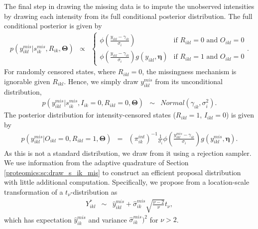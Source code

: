 The final step in drawing the missing data is to impute the unobserved intensities by drawing each intensity from its full conditional posterior distribution.
The full conditional posterior is given by
\begin{eqnarray*}
p(y_{ikl}^{mis}\vert s_{ik}^{mis},R_{ik},\bm{\Theta}) & \propto & \begin{cases}
\phi\left(\frac{y_{ikl} - \gamma_{ik}}{\sigma_{i}}\right) & \text{if }R_{ikl}=0 \text{ and }O_{ikl}=0\\
\phi\left(\frac{y_{ikl} - \gamma_{ik}}{\sigma_{i}}\right) g(y_{ikl}, \bm \eta) & \text{if }R_{ikl}=1 \text{ and }O_{ikl}=0
\end{cases} .
\end{eqnarray*}
For randomly censored states, where $R_{ikl}=0$, the missingness mechanism is ignorable given $R_{ikl}$.
Hence, we simply draw $y_{ikl}^{mis}$ from its unconditional distribution,
\begin{eqnarray*}
p(y_{ikl}^{mis}\vert s_{ik}^{mis}, I_{ik}=0, R_{ikl}=0, \bm{\Theta}) & \sim & Normal(\gamma_{ik},\sigma_{i}^{2}).
\end{eqnarray*}
%
The posterior distribution for intensity-censored states ($R_{ikl}=1$, $I_{ikl}=0$) is given by
\begin{eqnarray}
p(y_{ikl}^{mis}\vert O_{ikl}=0,R_{ikl}=1,\bm{\Theta}) & = & (\pi_{ik}^{int})^{-1}\frac{1}{\sigma_{i}} \phi\left(\frac{y_{ikl}^{mis}-\gamma_{ik}}{\sigma_{i}}\right) g(y_{ikl}^{mis}, \bm \eta) .
\label{proteomics:eq:intensity-censored-posterior-text}
\end{eqnarray}
As this is not a standard distribution, we draw from it using a rejection sampler.
We use information from the adaptive quadrature of Section \ref{proteomics:sc:draw_s_ik_mis} to construct an efficient proposal distribution with little additional computation.
Specifically, we propose from a location-scale transformation of a $t_{\nu}$-distribution as
\begin{eqnarray}
Y_{ikl}^{*} & \sim & \hat{y}_{ikl}^{mis}+\hat{\sigma}_{ik}^{mis} \sqrt{\frac{\nu-2}{\nu}} t_{\nu},
\end{eqnarray}
which has expectation $\hat{y}_{ik}^{mis}$ and variance $\hat{\sigma}_{ik}^{mis})^{2}$ for $\nu>2$.

